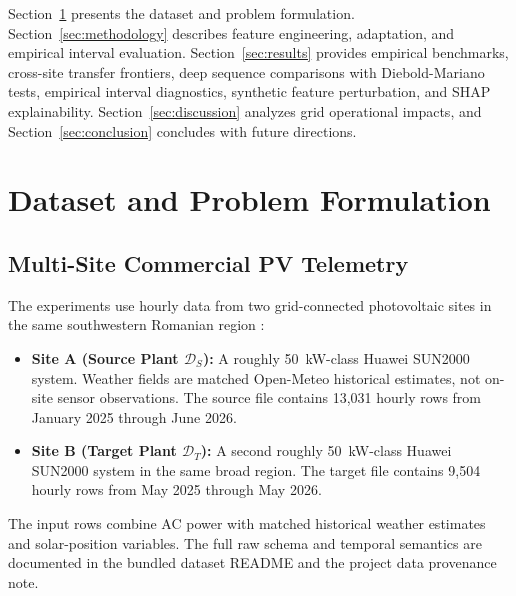 \documentclass[preprint,12pt,authoryear]{elsarticle}
\begin{document}
Section~\ref{sec:data_problem} presents the dataset and problem formulation. Section~\ref{sec:methodology} describes feature engineering, adaptation, and empirical interval evaluation. Section~\ref{sec:results} provides empirical benchmarks, cross-site transfer frontiers, deep sequence comparisons with Diebold-Mariano tests, empirical interval diagnostics, synthetic feature perturbation, and SHAP explainability. Section~\ref{sec:discussion} analyzes grid operational impacts, and Section~\ref{sec:conclusion} concludes with future directions.

\section{Dataset and Problem Formulation}
\label{sec:data_problem}

\subsection{Multi-Site Commercial PV Telemetry}
The experiments use hourly data from two grid-connected photovoltaic sites in the same southwestern Romanian region \citep{linca2026dataset}:
\begin{itemize}
    \item \textbf{Site A (Source Plant $\mathcal{D}_S$):} A roughly 50~kW-class Huawei SUN2000 system. Weather fields are matched Open-Meteo historical estimates, not on-site sensor observations. The source file contains 13,031 hourly rows from January 2025 through June 2026.
    \item \textbf{Site B (Target Plant $\mathcal{D}_T$):} A second roughly 50~kW-class Huawei SUN2000 system in the same broad region. The target file contains 9,504 hourly rows from May 2025 through May 2026.
\end{itemize}

The input rows combine AC power with matched historical weather estimates and solar-position variables. The full raw schema and temporal semantics are documented in the bundled dataset README and the project data provenance note.
\end{document}
